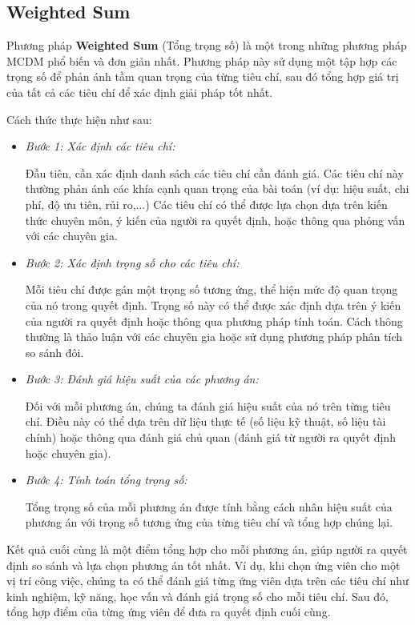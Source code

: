 \subsection{Weighted Sum}
Phương pháp \textbf{Weighted Sum} (Tổng trọng số) là một trong những phương pháp MCDM phổ biến và đơn giản nhất. Phương pháp này sử dụng một tập hợp các trọng số để phản ánh tầm quan trọng của từng tiêu chí, sau đó tổng hợp giá trị của tất cả các tiêu chí để xác định giải pháp tốt nhất.

Cách thức thực hiện như sau:
\begin{itemize}
    \item \textit{Bước 1: Xác định các tiêu chí:}
    
    Đầu tiên, cần xác định danh sách các tiêu chí cần đánh giá. Các tiêu chí này thường phản ánh các khía cạnh quan trọng của bài toán (ví dụ: hiệu suất, chi phí, độ ưu tiên, rủi ro,...)
Các tiêu chí có thể được lựa chọn dựa trên kiến thức chuyên môn, ý kiến của người ra quyết định, hoặc thông qua phỏng vấn với các chuyên gia.
    \item \textit{Bước 2: Xác định trọng số cho các tiêu chí:}
    
    Mỗi tiêu chí được gán một trọng số tương ứng, thể hiện mức độ quan trọng của nó trong quyết định.
Trọng số này có thể được xác định dựa trên ý kiến của người ra quyết định hoặc thông qua phương pháp tính toán. Cách thông thường là thảo luận với các chuyên gia hoặc sử dụng phương pháp phân tích so sánh đôi.
    \item \textit{Bước 3: Đánh giá hiệu suất của các phương án:}
    
    Đối với mỗi phương án, chúng ta đánh giá hiệu suất của nó trên từng tiêu chí.
Điều này có thể dựa trên dữ liệu thực tế (số liệu kỹ thuật, số liệu tài chính) hoặc thông qua đánh giá chủ quan (đánh giá từ người ra quyết định hoặc chuyên gia).
    \item \textit{Bước 4: Tính toán tổng trọng số:}
    
    Tổng trọng số của mỗi phương án được tính bằng cách nhân hiệu suất của phương án với trọng số tương ứng của từng tiêu chí và tổng hợp chúng lại.
\end{itemize}

Kết quả cuối cùng là một điểm tổng hợp cho mỗi phương án, giúp người ra quyết định so sánh và lựa chọn phương án tốt nhất. Ví dụ, khi chọn ứng viên cho một vị trí công việc, chúng ta có thể đánh giá từng ứng viên dựa trên các tiêu chí như kinh nghiệm, kỹ năng, học vấn và đánh giá trọng số cho mỗi tiêu chí. Sau đó, tổng hợp điểm của từng ứng viên để đưa ra quyết định cuối cùng.

